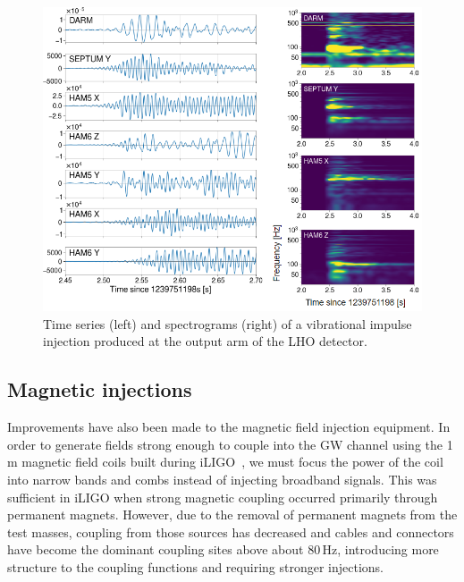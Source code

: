 \begin{figure}[h!]
	\centering
	\includegraphics[width=\textwidth]{figures/impulse.png}
	\caption{
		Time series (left) and spectrograms (right) of a vibrational impulse injection produced at the output arm of the LHO detector.}
	\label{fig:impulse}
\end{figure}


\subsection{Magnetic injections}\label{sec:magnetic-injections}

Improvements have also been made to the magnetic field injection equipment. In order to generate fields strong enough to couple into the \ac{GW} channel using the 1\,m magnetic field coils built during \ac{iLIGO}~\citep{Effler2015}, we must focus the power of the coil into narrow bands and combs instead of injecting broadband signals. This was sufficient in \ac{iLIGO} when strong magnetic coupling occurred primarily through permanent magnets. However, due to the removal of permanent magnets from the test masses, coupling from those sources has decreased and cables and connectors have become the dominant coupling sites above about 80\,Hz, introducing more structure to the coupling functions and requiring stronger injections.


